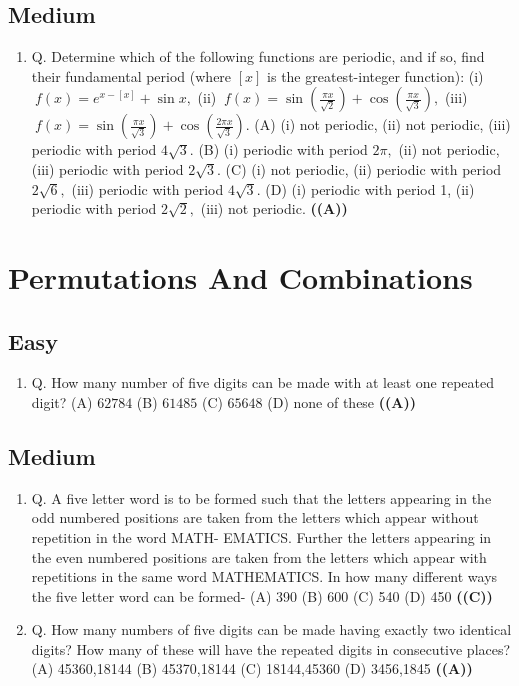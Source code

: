 \documentclass{article}
\begin{document}
\subsection{Medium}
\begin{enumerate}
\item Q. Determine which of the following functions are periodic, and if so, find their fundamental
period (where $[x]$ is the greatest-integer function):
(i) $\ f(x) = e^{x-[x]} + \sin x,$
(ii) $\ f(x) = \sin(\frac{\pi x}{\sqrt{2}}) + \cos(\frac{\pi x}{\sqrt{3}}),$
(iii) $\ f(x) = \sin(\frac{\pi x}{\sqrt{3}}) + \cos(\frac{2\pi x}{\sqrt{3}}).$
(A) (i) not periodic, (ii) not periodic, (iii) periodic with period $4\sqrt{3}.$
(B) (i) periodic with period $2\pi,$ (ii) not periodic, (iii) periodic with period $2\sqrt{3}.$
(C) (i) not periodic, (ii) periodic with period $2\sqrt{6},$ (iii) periodic with period $4\sqrt{3}.$
(D) (i) periodic with period 1, (ii) periodic with period $2\sqrt{2},$ (iii) not periodic. \hfill \textbf{((A))}
\end{enumerate}
\section{Permutations And Combinations}
\subsection{Easy}
\begin{enumerate}
\item Q. How many number of five digits can be made with at least one repeated digit?
(A) $62784$
(B) $61485$
(C) $65648$
(D) none of these \hfill \textbf{((A))}
\end{enumerate}
\subsection{Medium}
\begin{enumerate}
\item Q. A five letter word is to be formed such that the letters appearing in the odd numbered
positions are taken from the letters which appear without repetition in the word MATH-
EMATICS. Further the letters appearing in the even numbered positions are taken from
the letters which appear with repetitions in the same word MATHEMATICS. In how many
different ways the five letter word can be formed-
(A) 390
(B) 600
(C) 540
(D) 450 \hfill \textbf{((C))}
\item Q. How many numbers of five digits can be made having exactly two identical digits? How many of these will have the repeated digits in consecutive places?
(A) 45360,18144
(B) 45370,18144
(C) 18144,45360
(D) 3456,1845 \hfill \textbf{((A))}
\end{enumerate}
\end{document}
